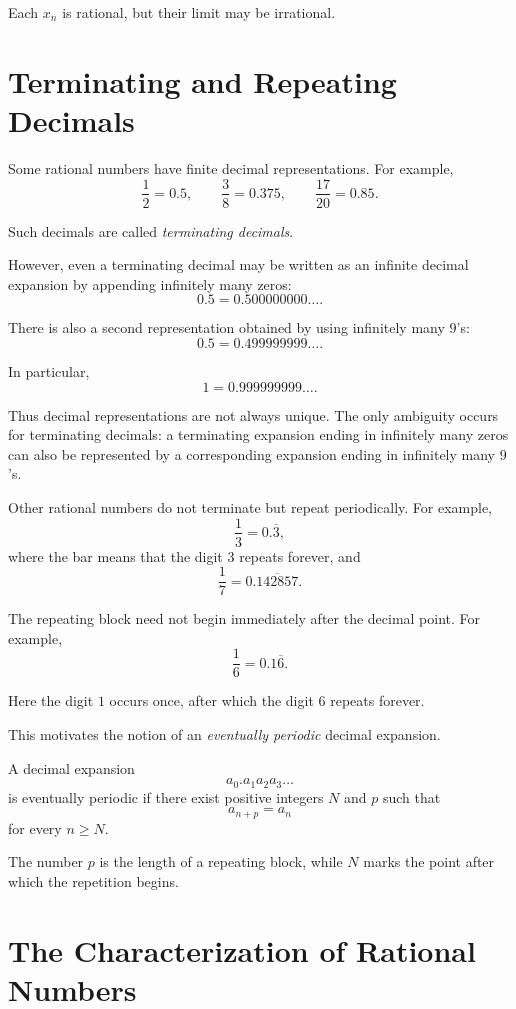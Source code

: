 \documentclass{essay}
\begin{document}
Each \(x_{n}\) is rational, but their limit may be irrational.

\section{Terminating and Repeating Decimals}

Some rational numbers have finite decimal representations. For example,
\[ \frac{1}{2}=0.5, \qquad \frac{3}{8}=0.375, \qquad \frac{17}{20}=0.85. \]

Such decimals are called \emph{terminating decimals}.

However, even a terminating decimal may be written as an infinite decimal expansion by appending infinitely many zeros:
\[ 0.5 = 0.500000000\ldots. \]

There is also a second representation obtained by using infinitely many \(9\)'s:
\[ 0.5 = 0.499999999\ldots. \]

In particular,
\[ 1 = 0.999999999\ldots. \]

Thus decimal representations are not always unique. The only ambiguity occurs for terminating decimals: a terminating expansion ending in infinitely many zeros can also be represented by a corresponding expansion ending in infinitely many \(9\)'s.

Other rational numbers do not terminate but repeat periodically. For example,
\[ \frac{1}{3} = 0.\overline{3}, \]
where the bar means that the digit \(3\) repeats forever, and
\[ \frac{1}{7} = 0.\overline{142857}. \]

The repeating block need not begin immediately after the decimal point. For example,
\[ \frac{1}{6} = 0.1\overline{6}. \]

Here the digit \(1\) occurs once, after which the digit \(6\) repeats forever.

This motivates the notion of an \emph{eventually periodic} decimal expansion.

A decimal expansion
\[ a_{0}.a_{1}a_{2}a_{3}\ldots \]
is eventually periodic if there exist positive integers \(N\) and \(p\) such that
\[ a_{n+p}=a_{n} \]
for every \(n\geq N\).

The number \(p\) is the length of a repeating block, while \(N\) marks the point after which the repetition begins.

\section{The Characterization of Rational Numbers}
\end{document}
